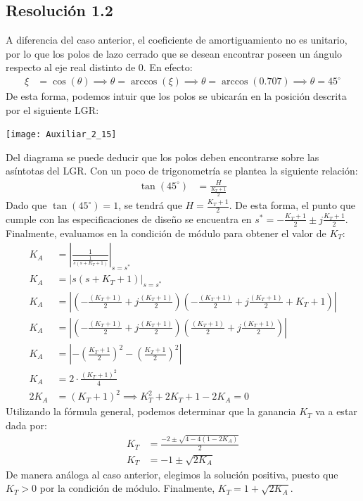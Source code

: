 \documentclass[
  11pt,
  letterpaper,
   addpoints,
   answers
  ]{exam}
\begin{document}
\begin{questions}
\begin{solution}
\subsection*{Resolución 1.2}
A diferencia del caso anterior, el coeficiente de amortiguamiento no es unitario, por lo que los polos de lazo cerrado que se desean encontrar poseen un ángulo respecto al eje real distinto de 0. En efecto:
\begin{align}
    \xi &= \cos(\theta) \implies \theta = \arccos(\xi) \implies \theta = \arccos(0.707) \implies \theta = 45^\circ \nonumber
\end{align}
De esta forma, podemos intuir que los polos se ubicarán en la posición descrita por el siguiente LGR:
\begin{center}
    \texttt{[image: Auxiliar\_2\_15]}
  \end{center}
Del diagrama se puede deducir que los polos deben encontrarse sobre las asíntotas del LGR. Con un poco de trigonometría se plantea la siguiente relación:
\begin{align}
    \tan(45^\circ) &= \frac{H}{\frac{K_T+1}{2}} \label{eq9}
\end{align}
Dado que \( \tan(45^\circ) = 1 \), se tendrá que \( H = \frac{K_T + 1}{2} \). De esta forma, el punto que cumple con las especificaciones de diseño se encuentra en \( s^* = -\frac{K_T+1}{2} \pm j\frac{K_T + 1}{2} \). Finalmente, evaluamos en la condición de módulo para obtener el valor de \( K_T \):
\begin{align}
    K_A &= \left|\frac{1}{\frac{1}{s(s+K_T + 1)}}\right|_{s=s^*} \nonumber \\
    K_A &= \left|s(s+K_T + 1)\right|_{s=s^*} \nonumber\\
    K_A &= \left|\left( -\frac{(K_T+1)}{2}+j\frac{(K_T+1)}{2}\right) \left(-\frac{(K_T+1)}{2}+j\frac{(K_T+1)}{2} + K_T + 1 \right)\right| \nonumber\\
    K_A &= \left|\left( -\frac{(K_T+1)}{2}+j\frac{(K_T+1)}{2}\right) \left(\frac{(K_T+1)}{2}+j\frac{(K_T+1)}{2}\right)\right| \nonumber \\
    K_A &= \left|-\left(\frac{K_T + 1}{2}\right)^2 - \left(\frac{K_T+1}{2}\right)^2\right| \nonumber \\
    K_A &= 2 \cdot \frac{(K_T + 1)^2}{4} \nonumber \\
    2K_A &= (K_T + 1)^2 \implies \boxed{K_T^2 + 2K_T + 1 - 2K_A = 0} \label{eq10} 
\end{align}
Utilizando la fórmula general, podemos determinar que la ganancia \( K_T \) va a estar dada por:
\begin{align}
    K_T &= \frac{-2\pm \sqrt{4-4(1-2K_A)}}{2} \nonumber\\
    K_T &= -1\pm \sqrt{2K_A} \label{eq11}
\end{align}
De manera análoga al caso anterior, elegimos la solución positiva, puesto que \( K_T > 0 \) por la condición de módulo. Finalmente, \( K_T = 1 + \sqrt{2K_A} \).
\end{solution}
    

\end{questions}
\end{document}
